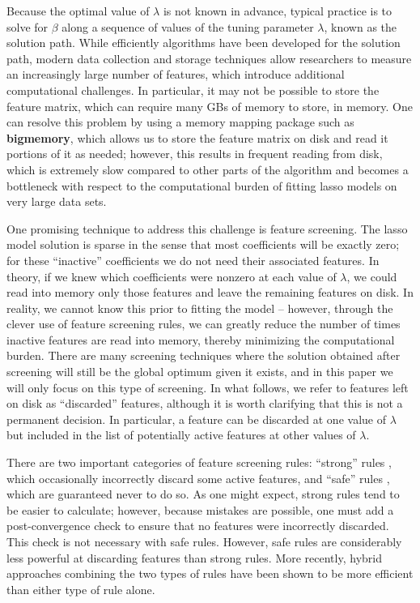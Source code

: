 Because the optimal value of $\lambda$ is not known in advance, typical practice is to solve for $\beta$ along a sequence of values of the tuning parameter $\lambda$, known as the solution path. While efficiently algorithms have been developed \citep{friedman2007pathwise} for the solution path, modern data collection and storage techniques allow researchers to measure an increasingly large number of features, which introduce additional computational challenges. In particular, it may not be possible to store the feature matrix, which can require many GBs of memory to store, in memory. One can resolve this problem by using a memory mapping package such as \textbf{bigmemory}, which allows us to store the feature matrix on disk and read it portions of it as needed; however, this results in frequent reading from disk, which is extremely slow compared to other parts of the algorithm and becomes a bottleneck with respect to the computational burden of fitting lasso models on very large data sets.

One promising technique to address this challenge is feature screening. The lasso model solution is sparse in the sense that most coefficients will be exactly zero; for these ``inactive'' coefficients we do not need their associated features.  In theory, if we knew which coefficients were nonzero at each value of $\lambda$, we could read into memory only those features and leave the remaining features on disk. In reality, we cannot know this prior to fitting the model -- however, through the clever use of feature screening rules, we can greatly reduce the number of times inactive features are read into memory, thereby minimizing the computational burden. There are many screening techniques where the solution obtained after screening will still be the global optimum given it exists, and in this paper we will only focus on this type of screening. In what follows, we refer to features left on disk as ``discarded'' features, although it is worth clarifying that this is not a permanent decision.  In particular, a feature can be discarded at one value of $\lambda$ but included in the list of potentially active features at other values of $\lambda$.

There are two important categories of feature screening rules: ``strong'' rules \citep{tibshirani2011regression, qian2019fast}, which occasionally incorrectly discard some active features, and ``safe'' rules \citep{ghaoui2010safe,wang2013lasso,xiang2012fast, xiang2011learning}, which are guaranteed never to do so.  As one might expect, strong rules tend to be easier to calculate; however, because mistakes are possible, one must add a post-convergence check to ensure that no features were incorrectly discarded. This check is not necessary with safe rules. However, safe rules are considerably less powerful at discarding features than strong rules. More recently, hybrid approaches \citep{zeng2021hybrid} combining the two types of rules have been shown to be more efficient than either type of rule alone.

